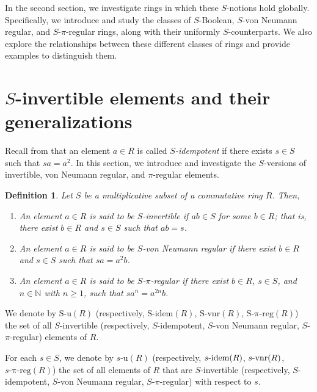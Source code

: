 \documentclass[12pt]{article}
\newtheorem{defn}[thm]{\bf Definition}
\def\Sidem{\mathrm{S\text{-}idem}}
\def\Su{\mathrm{S\text{-}u}}
\def\Svnr{\mathrm{S\text{-}vnr}}
\def\Spreg{\mathrm{S\text{-}\pi\text{-}reg}}
\def\preg{\mathrm{\pi\text{-}reg}}
\def\u{\mathrm{u}}
\def\idem{{\rm idem}}
\def\vnr{{\rm vnr}}
\begin{document}
In the second section, we investigate rings in which these \( S \)-notions hold globally. Specifically, we introduce and study the classes of \( S \)-Boolean, \( S \)-von Neumann regular, and \( S \)-\(\pi\)-regular rings, along with their uniformly \( S \)-counterparts. We also explore the relationships between these different classes of rings and provide examples to distinguish them.

   
   
   
   
\section{\texorpdfstring{$S$}{S}-invertible elements and their generalizations}\label{section-2}
Recall from \cite{Ers1} that an element \( a \in R \) is called \emph{\( S \)-idempotent} if there exists \( s \in S \) such that \( sa = a^2 \). In this section, we introduce and investigate the \( S \)-versions of invertible, von Neumann regular, and \(\pi\)-regular elements.


\begin{defn}
Let \( S \) be a multiplicative subset of a commutative ring \( R \). Then,
\begin{enumerate}
\item An element \( a \in R \) is said to be \emph{\( S \)-invertible} if \( ab \in S \) for some \( b \in R \); that is, there exist \( b \in R \) and \( s \in S \) such that \( ab = s \).

\item An element \( a \in R \) is said to be \emph{\( S \)-von Neumann regular} if there exist \( b \in R \) and \( s \in S \) such that \( sa = a^2 b \).

\item An element \( a \in R \) is said to be \emph{\( S \)-\(\pi\)-regular} if there exist \( b \in R \), \( s \in S \), and \( n \in \mathbb{N} \) with \( n \geq 1 \), such that \( sa^n = a^{2n}b \).
\end{enumerate}

\end{defn}


We denote by \( \Su(R) \) (respectively, \( \Sidem(R) \), \( \Svnr(R) \), \( \Spreg(R) \)) the set of all \( S \)-invertible (respectively, \( S \)-idempotent, \( S \)-von Neumann regular, \( S \)-\(\pi\)-regular) elements of \( R \).

For each \( s \in S \), we denote by \( s\text{-}\u(R) \) (respectively, \( s\text{-}\idem(R) \), \( s\text{-}\vnr(R) \), \( s\text{-}\preg(R) \)) the set of all elements of \( R \) that are \( S \)-invertible (respectively, \( S \)-idempotent, \( S \)-von Neumann regular, \( S \)-\(\pi\)-regular) with respect to \( s \).
\end{document}
